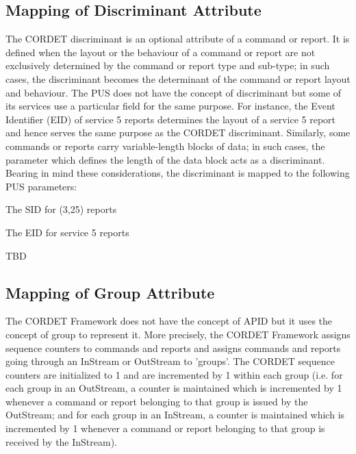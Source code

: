 \documentclass[a4paper,10pt]{article}
\newenvironment{fw_itemize}						%
{\begin{itemize}
  \setlength{\itemsep}{1mm}
  \setlength{\parskip}{0pt}
  \setlength{\parsep}{0pt}}
{\end{itemize}}
\begin{document}
\subsection{Mapping of Discriminant Attribute}\label{sec:mapDisc}
The CORDET discriminant is an optional attribute of a command or report. It is defined when the layout or the behaviour of a command or report are not exclusively determined by the command or report type and sub-type; in such cases, the discriminant becomes the determinant of the command or report layout and behaviour. The PUS does not have the concept of discriminant but some of its services use a particular field for the same purpose. For instance, the Event Identifier (EID) of service 5 reports determines the layout of a service 5 report and hence serves the same purpose as the CORDET discriminant. Similarly, some commands or reports carry variable-length blocks of data; in such cases, the parameter which defines the length of the data block acts as a discriminant. Bearing in mind these considerations, the discriminant is mapped to the following PUS parameters:

\begin{fw_itemize}
\item The SID for (3,25) reports
\item The EID for service 5 reports
\item TBD
\end{fw_itemize}

\subsection{Mapping of Group Attribute}\label{sec:mapGroup}
The CORDET Framework does not have the concept of APID but it uses the concept of group to represent it. More precisely, the CORDET Framework assigns sequence counters to commands and reports and assigns commands and reports going through an InStream or OutStream to 'groups'. The CORDET sequence counters are initialized to 1 and are incremented by 1 within each group (i.e. for each group in an OutStream, a counter is maintained which is incremented by 1 whenever a command or report belonging to that group is issued by the OutStream; and for each group in an InStream, a counter is maintained which is incremented by 1 whenever a command or report belonging to that group is received by the InStream). 
\end{document}
